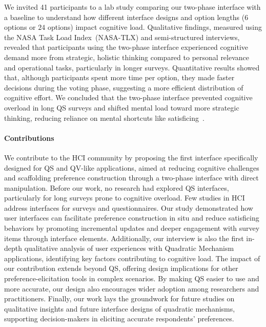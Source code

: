 We invited 41 participants to a lab study comparing our two-phase interface with a baseline to understand how different interface designs and option lengths ($6$ options or $24$ options) impact cognitive load. Qualitative findings, measured using the NASA Task Load Index~(NASA-TLX) and semi-structured interviews, revealed that participants using the two-phase interface experienced cognitive demand more from strategic, holistic thinking compared to personal relevance and operational tasks, particularly in longer surveys. Quantitative results showed that, although participants spent more time per option, they made faster decisions during the voting phase, suggesting a more efficient distribution of cognitive effort. We concluded that the two-phase interface prevented cognitive overload in long QS surveys and shifted mental load toward more strategic thinking, reducing reliance on mental shortcuts like satisficing~\cite{simonBehavioralModelRational1955}.


\paragraph{Contributions}
We contribute to the HCI community by proposing the first interface specifically designed for QS and QV-like applications, aimed at reducing cognitive challenges and scaffolding preference construction through a two-phase interface with direct manipulation. Before our work, no research had explored QS interfaces, particularly for long surveys prone to cognitive overload. Few studies in HCI address interfaces for surveys and questionnaires. Our study demonstrated how user interfaces can facilitate preference construction in situ and reduce satisficing behaviors by promoting incremental updates and deeper engagement with survey items through interface elements. Additionally, our interview is also the first in-depth qualitative analysis of user experiences with Quadratic Mechanism applications, identifying key factors contributing to cognitive load. The impact of our contribution extends beyond QS, offering design implications for other preference-elicitation tools in complex scenarios. By making QS easier to use and more accurate, our design also encourages wider adoption among researchers and practitioners. Finally, our work lays the groundwork for future studies on qualitative insights and future interface designs of quadratic mechanisms, supporting decision-makers in eliciting accurate respondents' preferences.

